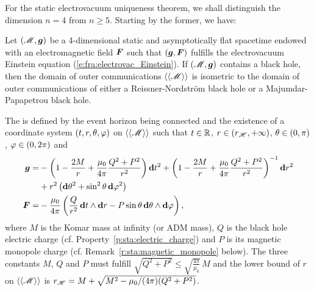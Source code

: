 For the static electrovacuum uniqueness theorem, we shall distinguish
the dimension $n=4$ from $n \geq 5$. Starting by the former, we have:

\begin{prop}[generalized Israel uniqueness theorem ($\bm{n = 4}$ electrovacuum)
\index{Israel uniqueness theorem!electrovacuum}]
\label{p:sta:Israel_uniq_electrovac_n4}
Let $(\mathscr{M},\bm{g})$ be a 4-dimensional static and asymptotically flat spacetime
endowed with an electromagnetic field $\bm{F}$
such that
$(\bm{g},\bm{F})$ fulfills the electrovacuum Einstein equation (\ref{e:fra:electrovac_Einstein}).
If $(\mathscr{M},\bm{g})$ contains a black hole, then the domain of outer communications $\langle\langle \mathscr{M}\rangle\rangle$ is isometric
to the domain of outer communications of either a Reissner-Nordström black hole or a Majumdar-Papapetrou black hole.

The  is defined by the event horizon being connected and
the existence of a
coordinate system $(t,r,\theta,\varphi)$ on $\langle\langle \mathscr{M}\rangle\rangle$ such
that $t\in\mathbb{R}$, $r\in (r_{\mathscr{H}},+\infty)$, $\theta \in (0,\pi)$,
$\varphi\in (0, 2\pi)$ and
\begin{subequations}
\label{e:sta:ReiNor_n4}
\begin{align}
    \bm{g}  = & -\left( 1 - \frac{2 M}{r} + \frac{\mu_0}{4\pi} \frac{Q^2 + P^2}{r^2} \right) \mathbf{d} t^2
    + \left( 1 - \frac{2 M}{r} + \frac{\mu_0}{4\pi} \frac{Q^2 + P^2}{r^2} \right) ^{-1} \mathbf{d} r^2
    \nonumber \\
    &  + r^2 \left( \mathbf{d}\theta^2 + \sin^2\theta\, \mathbf{d}\varphi^2 \right) \label{e:sta:g_ReiNor_n4} \\
    \bm{F}  = & - \frac{\mu_0}{4\pi} \left( \frac{Q}{r^2}\,  \mathbf{d} t \wedge \mathbf{d} r
     - P \sin\theta \, \mathbf{d} \theta \wedge\mathbf{d} \varphi \right) , \label{e:sta:F_ReiNor_n4}
\end{align}
\end{subequations}
where $M$ is the Komar mass at infinity
(or ADM mass), $Q$ is the black hole electric charge (cf. Property~\ref{p:sta:electric_charge})
and
$P$ is its magnetic monopole charge (cf. Remark~\ref{r:sta:magnetic_monopole} below).
The three constants $M$, $Q$ and $P$ must fulfill
$\sqrt{Q^2 + P^2} \leq \sqrt{\frac{4\pi}{\mu_0}}\, M$
and the lower bound of $r$ on $\langle\langle \mathscr{M}\rangle\rangle$ is
 $r_{\mathscr{H}} = M + \sqrt{M^2 - \mu_0/(4\pi)(Q^2 + P^2)}$.


\end{prop}
